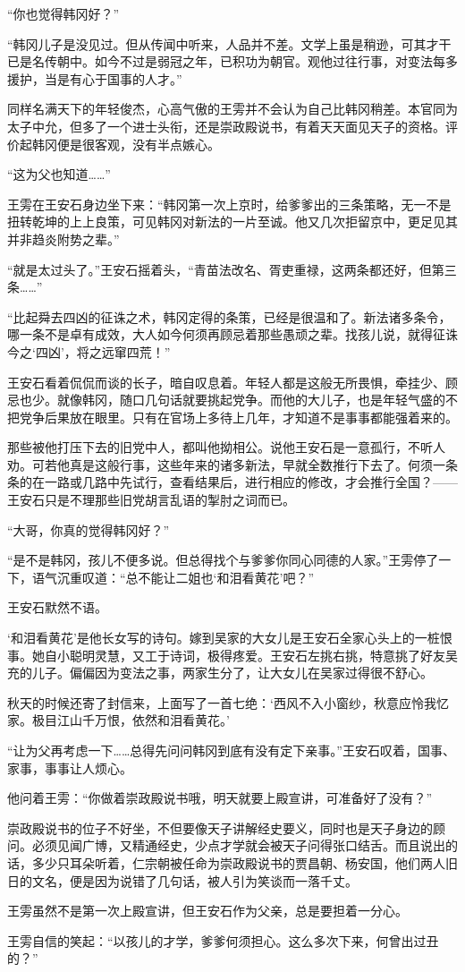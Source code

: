 “你也觉得韩冈好？”

“韩冈儿子是没见过。但从传闻中听来，人品并不差。文学上虽是稍逊，可其才干已是名传朝中。如今不过是弱冠之年，已积功为朝官。观他过往行事，对变法每多援护，当是有心于国事的人才。”

同样名满天下的年轻俊杰，心高气傲的王雱并不会认为自己比韩冈稍差。本官同为太子中允，但多了一个进士头衔，还是崇政殿说书，有着天天面见天子的资格。评价起韩冈便是很客观，没有半点嫉心。

“这为父也知道……”

王雱在王安石身边坐下来：“韩冈第一次上京时，给爹爹出的三条策略，无一不是扭转乾坤的上上良策，可见韩冈对新法的一片至诚。他又几次拒留京中，更足见其并非趋炎附势之辈。”

“就是太过头了。”王安石摇着头，“青苗法改名、胥吏重禄，这两条都还好，但第三条……”

“比起舜去四凶的征诛之术，韩冈定得的条策，已经是很温和了。新法诸多条令，哪一条不是卓有成效，大人如今何须再顾忌着那些愚顽之辈。找孩儿说，就得征诛今之‘四凶’，将之远窜四荒！”

王安石看着侃侃而谈的长子，暗自叹息着。年轻人都是这般无所畏惧，牵挂少、顾忌也少。就像韩冈，随口几句话就要挑起党争。而他的大儿子，也是年轻气盛的不把党争后果放在眼里。只有在官场上多待上几年，才知道不是事事都能强着来的。

那些被他打压下去的旧党中人，都叫他拗相公。说他王安石是一意孤行，不听人劝。可若他真是这般行事，这些年来的诸多新法，早就全数推行下去了。何须一条条的在一路或几路中先试行，查看结果后，进行相应的修改，才会推行全国？——王安石只是不理那些旧党胡言乱语的掣肘之词而已。

“大哥，你真的觉得韩冈好？”

“是不是韩冈，孩儿不便多说。但总得找个与爹爹你同心同德的人家。”王雱停了一下，语气沉重叹道：“总不能让二姐也‘和泪看黄花’吧？”

王安石默然不语。

‘和泪看黄花’是他长女写的诗句。嫁到吴家的大女儿是王安石全家心头上的一桩恨事。她自小聪明灵慧，又工于诗词，极得疼爱。王安石左挑右挑，特意挑了好友吴充的儿子。偏偏因为变法之事，两家生分了，让大女儿在吴家过得很不舒心。

秋天的时候还寄了封信来，上面写了一首七绝：‘西风不入小窗纱，秋意应怜我忆家。极目江山千万恨，依然和泪看黄花。’

“让为父再考虑一下……总得先问问韩冈到底有没有定下亲事。”王安石叹着，国事、家事，事事让人烦心。

他问着王雱：“你做着崇政殿说书哦，明天就要上殿宣讲，可准备好了没有？”

崇政殿说书的位子不好坐，不但要像天子讲解经史要义，同时也是天子身边的顾问。必须见闻广博，又精通经史，少点才学就会被天子问得张口结舌。而且说出的话，多少只耳朵听着，仁宗朝被任命为崇政殿说书的贾昌朝、杨安国，他们两人旧日的文名，便是因为说错了几句话，被人引为笑谈而一落千丈。

王雱虽然不是第一次上殿宣讲，但王安石作为父亲，总是要担着一分心。

王雱自信的笑起：“以孩儿的才学，爹爹何须担心。这么多次下来，何曾出过丑的？”

